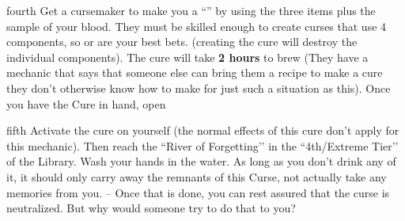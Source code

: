 \documentclass[notebook]{GL2020} %
\begin{document}
\begin{page}{fourth}
Get a cursemaker to make you a ``\iPanacea{}'' by using the three items plus the sample of your blood. They must be skilled enough to create curses that use 4 components, so \cPrince{} or \cCurse{} are your best bets. (creating the cure will destroy the individual components). The cure will take \textbf{2 hours} to brew (They have a mechanic that says that someone else can bring them a recipe to make a cure they don’t otherwise know how to make for just such a situation as this). Once you have the Cure in hand, open 
\end{page}

\begin{page}{fifth}
Activate the cure on yourself (the normal effects of this cure don't apply for this mechanic). Then reach the ``River of Forgetting’’ in the ``4th/Extreme Tier’’ of the Library. Wash your hands in the water. As long as you don’t drink any of it, it should only carry away the remnants of this Curse, not actually take any memories from you. -- Once that is done, you can rest assured that the curse is neutralized. But why would someone try to do that to you?

\end{page}

\endnotebook
\end{document}
